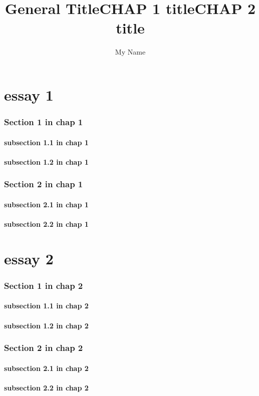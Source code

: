 \documentclass[xcolor={usenames,dvipsnames,table},10pt]{beamer}
\begin{document}
{
\title[] %
{General Title}
\author[] %
{My Name}
\begin{frame}[plain]
\titlepage
\end{frame}
}

\part{essay 1}
\title %
{CHAP 1 title}

\begin{frame}[plain]
\titlepage
\end{frame}


\section{Section 1 in chap 1}
\subsection{subsection 1.1 in chap 1}
\subsection{subsection 1.2 in chap 1}
\section{Section 2 in chap 1}
\subsection{subsection 2.1 in chap 1}
\subsection{subsection 2.2 in chap 1}

\part{essay 2}
\title %
{CHAP 2 title}

\begin{frame}[plain]
\titlepage
\end{frame}

\section{Section 1 in chap 2}
\subsection{subsection 1.1 in chap 2}
\subsection{subsection 1.2 in chap 2}
\section{Section 2 in chap 2}
\subsection{subsection 2.1 in chap 2}
\subsection{subsection 2.2 in chap 2}
\end{document}
